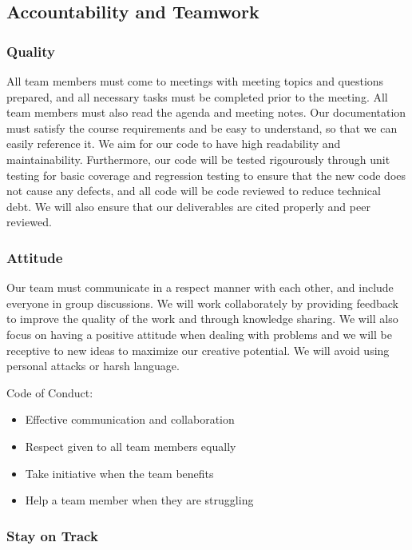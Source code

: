 \documentclass{article}
\begin{document}
\subsection*{Accountability and Teamwork}

\subsubsection*{Quality} 

All team members must come to meetings with meeting topics and questions prepared, and all necessary tasks must be completed prior to the meeting. All team members must also read the agenda and meeting notes. 
Our documentation must satisfy the course requirements and be easy to understand, so that we can easily reference it. We aim for our code to have high readability and maintainability. Furthermore, our code 
will be tested rigourously through unit testing for basic coverage and regression testing to ensure that the new code does not cause any defects, and all code will be code reviewed to reduce technical debt.
We will also ensure that our deliverables are cited properly and peer reviewed.

\subsubsection*{Attitude}

Our team must communicate in a respect manner with each other, and include everyone in group discussions. We will work collaborately by providing feedback to improve the quality of the work and through 
knowledge sharing. We will also focus on having a positive attitude when dealing with problems and we will be receptive to new ideas to maximize our creative potential. We will avoid using personal attacks 
or harsh language.

Code of Conduct: 
\begin{itemize}
    \item Effective communication and collaboration
    \item Respect given to all team members equally
    \item Take initiative when the team benefits
    \item Help a team member when they are struggling
\end{itemize}

\subsubsection*{Stay on Track}
\end{document}
